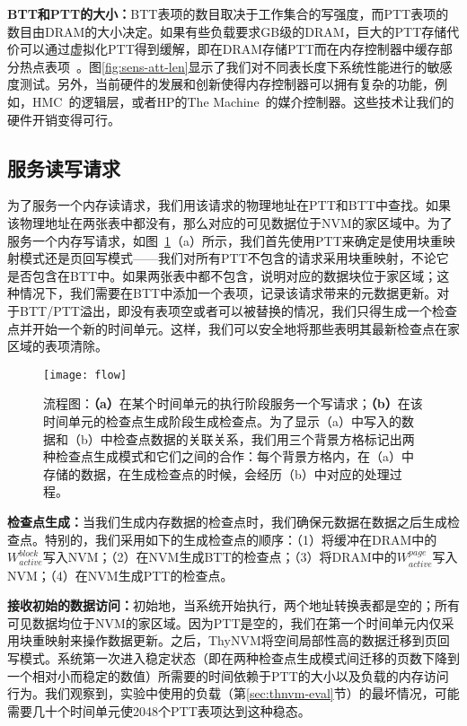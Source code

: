 \textbf{BTT和PTT的大小：}BTT表项的数目取决于工作集合的写强度，而PTT表项的数目由DRAM的大小决定。如果有些负载要求GB级的DRAM，巨大的PTT存储代价可以通过虚拟化PTT得到缓解，即在DRAM存储PTT而在内存控制器中缓存部分热点表项~\cite{Meza2012, Yoon2010, Burcea2008}。图\ref{fig:sens-att-len}显示了我们对不同表长度下系统性能进行的敏感度测试。另外，当前硬件的发展和创新使得内存控制器可以拥有复杂的功能，例如，HMC~\cite{HMC:2011}的逻辑层，或者HP的The Machine~\cite{TheMachine:2015}的媒介控制器。这些技术让我们的硬件开销变得可行。

\subsection{服务读写请求}

为了服务一个内存读请求，我们用该请求的物理地址在PTT和BTT中查找。如果该物理地址在两张表中都没有，那么对应的可见数据位于NVM的家区域中。为了服务一个内存写请求，如图~\ref{fig:flow}（a）所示，我们首先使用PTT来确定是使用块重映射模式还是页回写模式——我们对所有PTT不包含的请求采用块重映射，不论它是否包含在BTT中。如果两张表中都不包含，说明对应的数据块位于家区域；这种情况下，我们需要在BTT中添加一个表项，记录该请求带来的元数据更新。对于BTT/PTT溢出，即没有表项空或者可以被替换的情况，我们只得生成一个检查点并开始一个新的时间单元。这样，我们可以安全地将那些表明其最新检查点在家区域的表项清除。

\begin{figure}[!h]
\centering
\texttt{[image: flow]}
\caption{流程图：\textbf{（a）}在某个时间单元的执行阶段服务一个写请求；\textbf{（b）}在该时间单元的检查点生成阶段生成检查点。为了显示（a）中写入的数据和（b）中检查点数据的关联关系，我们用三个背景方格标记出两种检查点生成模式和它们之间的合作：每个背景方格内，在（a）中存储的数据，在生成检查点的时候，会经历（b）中对应的处理过程。}
\label{fig:flow}
\end{figure}

\textbf{检查点生成：}当我们生成内存数据的检查点时，我们确保元数据在数据之后生成检查点。特别的，我们采用如下的生成检查点的顺序：（1）将缓冲在DRAM中的$W^{block}_{active}$写入NVM；（2）在NVM生成BTT的检查点；（3）将DRAM中的$W^{page}_{active}$写入NVM；（4）在NVM生成PTT的检查点。

\textbf{接收初始的数据访问：}初始地，当系统开始执行，两个地址转换表都是空的；所有可见数据均位于NVM的家区域。因为PTT是空的，我们在第一个时间单元内仅采用块重映射来操作数据更新。之后，ThyNVM将空间局部性高的数据迁移到页回写模式。系统第一次进入稳定状态（即在两种检查点生成模式间迁移的页数下降到一个相对小而稳定的数值）所需要的时间依赖于PTT的大小以及负载的内存访问行为。我们观察到，实验中使用的负载（第\ref{sec:thnvm-eval}节）的最坏情况，可能需要几十个时间单元使2048个PTT表项达到这种稳态。

